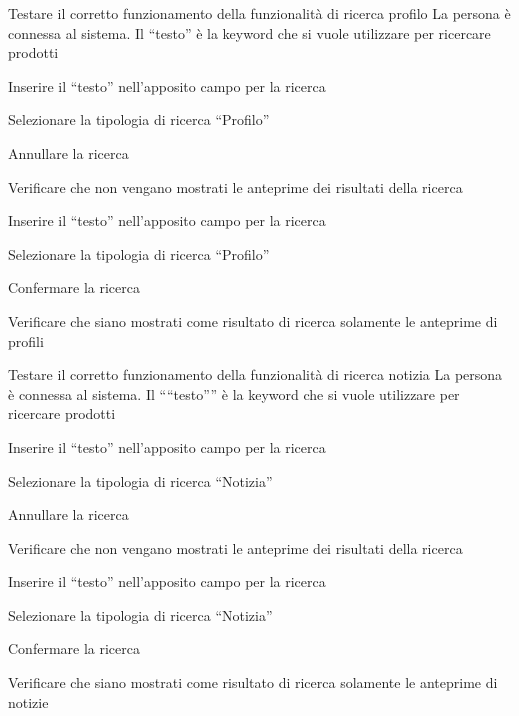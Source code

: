 
{Testare il corretto funzionamento della funzionalità di ricerca profilo}
{La persona è connessa al sistema. Il ``testo'' è la keyword che si vuole utilizzare per ricercare prodotti}
{\begin{enumCU}
	\item Inserire il ``testo'' nell'apposito campo per la ricerca
	\item Selezionare la tipologia di ricerca ``Profilo''
	\item Annullare la ricerca
	\item Verificare che non vengano mostrati le anteprime dei risultati della ricerca
	\item Inserire il ``testo'' nell'apposito campo per la ricerca
	\item Selezionare la tipologia di ricerca ``Profilo''
	\item Confermare la ricerca
	\item Verificare che siano mostrati come risultato di ricerca solamente le anteprime di profili
\end{enumCU}}


{Testare il corretto funzionamento della funzionalità di ricerca notizia}
{La persona è connessa al sistema. Il ````testo'''' è la keyword che si vuole utilizzare per ricercare prodotti}
{\begin{enumCU}
	\item Inserire il ``testo'' nell'apposito campo per la ricerca
	\item Selezionare la tipologia di ricerca ``Notizia''
	\item Annullare la ricerca
	\item Verificare che non vengano mostrati le anteprime dei risultati della ricerca
	\item Inserire il ``testo'' nell'apposito campo per la ricerca
	\item Selezionare la tipologia di ricerca ``Notizia''
	\item Confermare la ricerca
	\item Verificare che siano mostrati come risultato di ricerca solamente le anteprime di notizie
\end{enumCU}}





